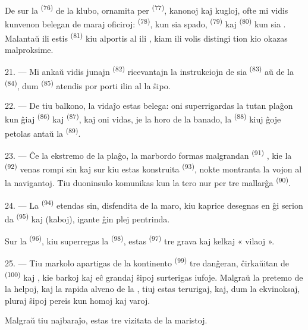 De sur la  \textsuperscript{(76)} de la klubo, ornamita per
 \textsuperscript{(77)}, kanonoj kaj kugloj, ofte mi vidis
kunvenon belegan de maraj oficiroj: 
\textsuperscript{(78)}, kun sia spado, 
\textsuperscript{(79)} kaj  \textsuperscript{(80)} kun sia
. Malantaŭ ili estis  \textsuperscript{(81)} kiu
alportis al ili , kiam ili volis distingi tion kio okazas
malproksime.

21. --- Mi ankaŭ vidis junajn  \textsuperscript{(82)}
ricevantajn la instrukciojn de sia  \textsuperscript{(83)}
aŭ de la  \textsuperscript{(84)}, dum 
\textsuperscript{(85)} atendis por porti ilin al la ŝipo.

22. --- De tiu balkono, la vidaĵo estas belega: oni superrigardas la tutan
plaĝon kun ĝiaj  \textsuperscript{(86)} kaj 
\textsuperscript{(87)}, kaj oni vidas, je la horo de la banado, la
 \textsuperscript{(88)} kiuj ĝoje petolas antaŭ la
 \textsuperscript{(89)}.

23. --- Ĉe la ekstremo de la plaĝo, la marbordo formas malgrandan
 \textsuperscript{(91)} , kie la
 \textsuperscript{(92)} venas rompi sin kaj sur kiu estas
konstruita  \textsuperscript{(93)}, nokte montranta la vojon al
la navigantoj. Tiu duoninsulo komunikas kun la tero nur per  tre
mallarĝa \textsuperscript{(90)}.

\VUsaut{3.0mm}
\VUsaut{3.0mm}

24. --- La  \textsuperscript{(94)} etendas sin, disfendita de la
maro, kiu kaprice desegnas en ĝi serion da 
\textsuperscript{(95)} kaj  (kaboj), igante ĝin plej
pentrinda.

Sur la  \textsuperscript{(96)}, kiu superregas la
 \textsuperscript{(98)}, estas 
\textsuperscript{(97)} tre grava kaj kelkaj « vilaoj ».

25. --- Tiu markolo apartigas de la kontinento 
\textsuperscript{(99)} tre danĝeran, ĉirkaŭitan de 
\textsuperscript{(100)} kaj , kie barkoj kaj eĉ grandaj
ŝipoj surterigas iufoje. Malgraŭ la pretemo de la helpoj, kaj la rapida alveno
de la , tiuj  estas terurigaj, kaj, dum la
 ekvinoksaj, pluraj ŝipoj pereis kun homoj kaj varoj.

Malgraŭ tiu najbaraĵo,  estas tre vizitata de la maristoj.
\VUsaut{6.0mm}
\VUfilet{22mm}
